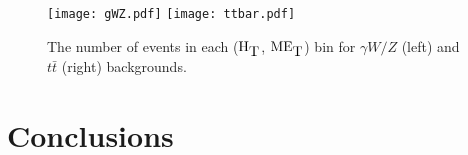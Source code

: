 \begin{figure}
\begin{center}
\texttt{[image: gWZ.pdf]}
\texttt{[image: ttbar.pdf]}
\end{center}
\caption{The number of events in each ($\mbox{H}_{\mbox{T}}$, $\mbox{ME}_{\mbox{T}}$) bin for $\gamma W/Z$
(left) and $t\bar{t}$ (right) backgrounds.}
\label{fig:wz_and_ttbar}
\end{figure}







\section{Conclusions}
